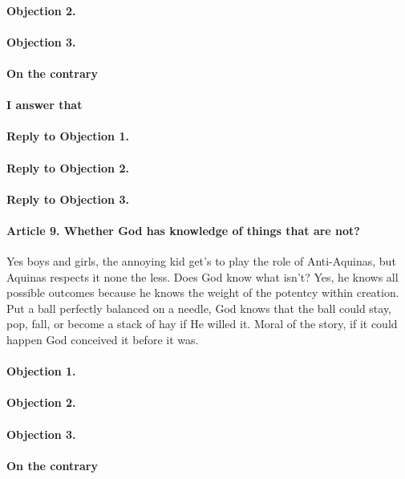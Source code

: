 \documentclass{ucetd}
\begin{document}
\paragraph{Objection 2.}
\paragraph{Objection 3.}
\paragraph{On the contrary}
\paragraph{I answer that}
\paragraph{Reply to Objection 1.}
\paragraph{Reply to Objection 2.}
\paragraph{Reply to Objection 3.}

\paragraph{Article 9. Whether God has knowledge of things that are not?}
Yes boys and girls, the annoying kid get's to play the role of Anti-Aquinas, but Aquinas respects it none the less. Does God know what isn't? 
Yes, he knows all possible outcomes because he knows the weight of the potentcy within creation. Put a ball perfectly balanced on a needle, God knows that the ball could stay, pop, fall, or become a stack of hay if He willed it. Moral of the story, if it could happen God conceived it before it was.
\paragraph{Objection 1.}
\paragraph{Objection 2.}
\paragraph{Objection 3.}
\paragraph{On the contrary}
\end{document}
